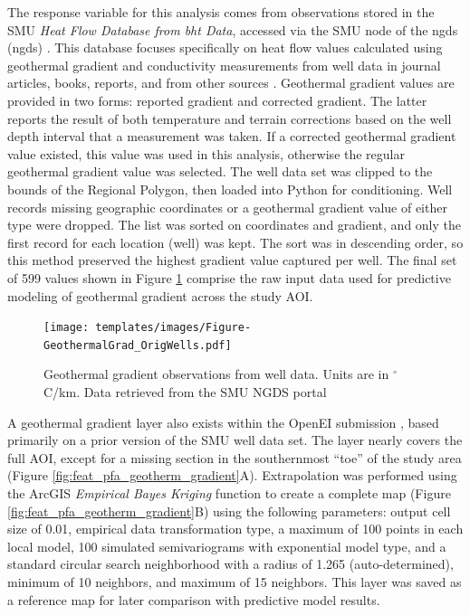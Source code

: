 The response variable for this analysis comes from observations stored in the SMU \textit{Heat Flow Database from \acrlong{bht} Data}, accessed via the SMU node of the \acrlong{ngds} (\acrshort{ngds}) \citep{smu_geothermal_2021}. This database focuses specifically on heat flow values calculated using geothermal gradient and conductivity measurements from well data in journal articles, books, reports, and from other sources \citep{blackwell_geothermal_2014}. Geothermal gradient values are provided in two forms: reported gradient and corrected gradient. The latter reports the result of both temperature and terrain corrections based on the well depth interval that a measurement was taken. If a corrected geothermal gradient value existed, this value was used in this analysis, otherwise the regular geothermal gradient value was selected. The well data set was clipped to the bounds of the Regional Polygon, then loaded into Python for conditioning. Well records missing geographic coordinates or a geothermal gradient value of either type were dropped. The list was sorted on coordinates and gradient, and only the first record for each location (well) was kept. The sort was in descending order, so this method preserved the highest gradient value captured per well. The final set of 599 values shown in Figure \ref{fig:feat_geotherm_gradient} comprise the raw input data used for predictive modeling of geothermal gradient across the study AOI.

\begin{figure}[!htp]
\centering
\texttt{[image: templates/images/Figure-GeothermalGrad\_OrigWells.pdf]}
\caption[Geothermal gradient data layer]{Geothermal gradient observations from well data. Units are in $^\circ$C/km. Data retrieved from the SMU NGDS portal \protect\citep{smu_geothermal_2021}}
\label{fig:feat_geotherm_gradient}
\end{figure}

A geothermal gradient layer also exists within the \citeauthor{bielicki_hydrogeolgic_2015} OpenEI submission \citep{kelley_geothermal_2015}, based primarily on a prior version of the SMU well data set. The layer nearly covers the full AOI, except for a missing section in the southernmost “toe” of the study area (Figure \ref{fig:feat_pfa_geotherm_gradient}A). Extrapolation was performed using the ArcGIS \textit{Empirical Bayes Kriging} function to create a complete map (Figure \ref{fig:feat_pfa_geotherm_gradient}B) using the following parameters: output cell size of 0.01, empirical data transformation type, a maximum of 100 points in each local model, 100 simulated semivariograms with exponential model type, and a standard circular search neighborhood with a radius of 1.265 (auto-determined), minimum of 10 neighbors, and maximum of 15 neighbors. This layer was saved as a reference map for later comparison with predictive model results.  

